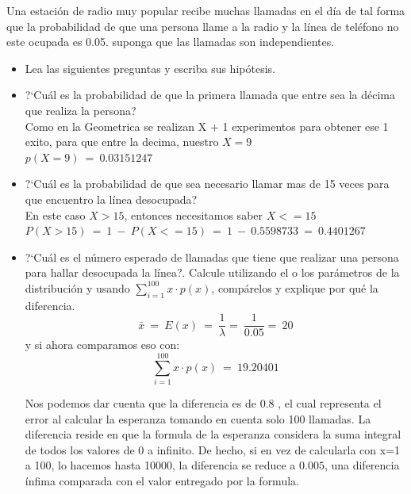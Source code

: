 Una estaci\'on de radio muy popular recibe muchas llamadas en el d\'ia de tal forma que la probabilidad
de que una persona llame a la radio y la l\'inea de tel\'efono no este ocupada es 0.05. suponga que las
llamadas son independientes.

\begin{itemize}
	\item Lea las siguientes preguntas y escriba sus hip\'otesis.
	\item ?`Cu\'al es la probabilidad de que la primera llamada que entre sea la d\'ecima que realiza la persona?\\
		Como en la Geometrica se realizan X + 1 experimentos para obtener ese 1 exito, para que entre la decima, nuestro $X=9$\\
		$p(X=9)\ =\ 0.03151247$\\%
	\item ?`Cu\'al es la probabilidad de que sea necesario llamar mas de 15 veces para que encuentro la l\'inea desocupada?\\
		En este caso $X>15$, entonces necesitamos saber $X<=15$\\
		$P(X>15)\ =\ 1\ -\ P(X<=15)\ =\ 1\ -\ 0.5598733\ =\ 0.4401267\ $\\ %
	\item ?`Cu\'al es el n\'umero esperado de llamadas que tiene que realizar una persona para hallar desocupada la l\'inea?.
		 Calcule utilizando el o los par\'ametros de la distribuci\'on y usando $\sum_{i=1}^{100}x\cdot p(x)$, comp\'arelos y explique por qu\'e la diferencia.\\
	$$\bar{x}\ =\ E(x)\ =\ \frac{1}{\lambda} =\ \frac{1}{0.05} =\ 20$$
	y si ahora comparamos  eso con:\\
	$$\sum_{i=1}^{100}x\cdot p(x)\ =\ 19.20401$$
	
	Nos podemos dar cuenta que la diferencia es de $0.8$ , el cual representa el error al calcular la esperanza tomando en cuenta solo 100 llamadas. La diferencia reside en que la formula de la esperanza considera la suma integral de todos los valores de 0 a infinito. De hecho, si en vez de calcularla con x=1 a 100, lo hacemos hasta 10000, la diferencia se reduce a $0.005$, una diferencia \'infima comparada con el valor entregado por la formula.


\end{itemize}
